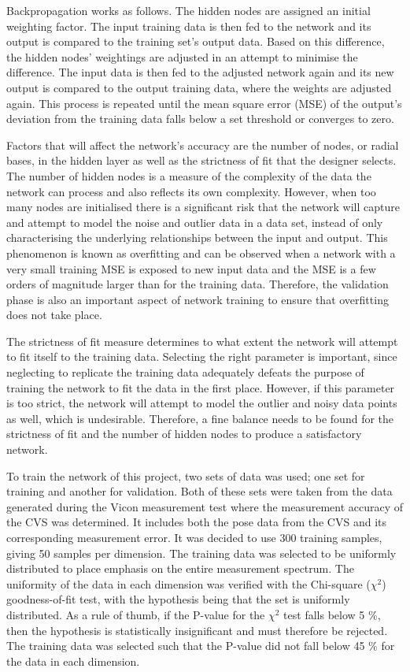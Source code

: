 Backpropagation works as follows. The hidden nodes are assigned an initial weighting factor. The input training data is then fed to the network and its output is compared to the training set's output data. Based on this difference, the hidden nodes' weightings are adjusted in an attempt to minimise the difference. The input data is then fed to the adjusted network again and its new output is compared to the output training data, where the weights are adjusted again. This process is repeated until the mean square error (MSE) of the output's deviation from the training data falls below a set threshold or converges to zero. 

Factors that will affect the network's accuracy are the number of nodes, or radial bases, in the hidden layer as well as the strictness of fit that the designer selects. The number of hidden nodes is a measure of the complexity of the data the network can process and also reflects its own complexity. However, when too many nodes are initialised there is a significant risk that the network will capture and attempt to model the noise and outlier data in a data set, instead of only characterising the underlying relationships between the input and output. This phenomenon is known as overfitting and can be observed when a network with a very small training MSE is exposed to new input data and the MSE is a few orders of magnitude larger than for the training data. Therefore, the validation phase is also an important aspect of network training to ensure that overfitting does not take place. 

The strictness of fit measure determines to what extent the network will attempt to fit itself to the training data. Selecting the right parameter is important, since neglecting to replicate the training data adequately defeats the purpose of training the network to fit the data in the first place. However, if this parameter is too strict, the network will attempt to model the outlier and noisy data points as well, which is undesirable. Therefore, a fine balance needs to be found for the strictness of fit and the number of hidden nodes to produce a satisfactory network.  

To train the network of this project, two sets of data was used; one set for training and another for validation. Both of these sets were taken from the data generated during the Vicon measurement test where the measurement accuracy of the CVS was determined. It includes both the pose data from the CVS and its corresponding measurement error. It was decided to use 300 training samples, giving 50 samples per dimension. The training data was selected to be uniformly distributed to place emphasis on the entire measurement spectrum. The uniformity of the data in each dimension was verified with the Chi-square ($\chi^2$) goodness-of-fit test, with the hypothesis being that the set is uniformly distributed. As a rule of thumb, if the P-value for the $\chi^2$ test falls below 5 \%, then the hypothesis is statistically insignificant and must therefore be rejected. The training data was selected such that the P-value did not fall below 45 \% for the data in each dimension. 

